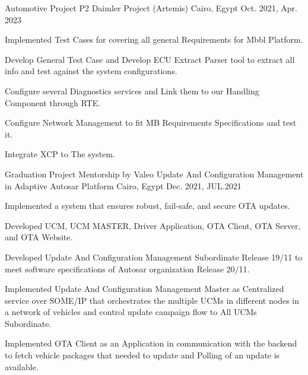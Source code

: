 \begin{cventries}
{\begin{cvitems}
    \end{cvitems}
}
\cventry
{\normalsize Automotive Project} %
{\Large P2 Daimler Project (Artemis)} %
{\normalsize Cairo, Egypt} %
{\normalsize Oct. 2021, Apr. 2023} %
{
      \begin{cvitems} %
        \item {\normalsize Implemented Test Cases for covering all general Requirements for Mbbl Platform. }
        \item {\normalsize Develop General Test Case and Develop ECU Extract Parser tool to extract all info and test against the system configurations.}
        \item {\normalsize Configure several Diagnostics services and Link them to our Handling Component through RTE.}
        \item {\normalsize Configure Network Management to fit MB Requirements Specifications and test it.} 
        \item {\normalsize Integrate XCP to The system.} 
      \end{cvitems}
}  
\cventry
{\normalsize Graduation Project Mentorship by Valeo} %
{\Large Update And Configuration Management in Adaptive Autosar Platform} %
{\normalsize Cairo, Egypt} %
{\normalsize Dec. 2021, JUL.2021} %
{
      \begin{cvitems} %
        \item {\normalsize Implemented a system that ensures robust, fail-safe, and secure OTA updates.}
        \item {\normalsize Developed UCM, UCM MASTER, Driver Application, OTA Client, OTA Server, and OTA Website.}
        \item {\normalsize Developed Update And Configuration Management Subordinate Release 19/11 to meet software specifications of Autosar organization Release 20/11.}
        \item {\normalsize Implemented Update And Configuration Management Master as Centralized service over SOME/IP that orchestrates the multiple UCMs in different nodes in a network of vehicles and control update campaign flow to All UCMs Subordinate.}
        \item{\normalsize Implemented OTA Client as an Application in communication with the backend to fetch vehicle packages that needed to update and Polling of an update is available.}

\end{cvitems}}
\end{cventries}

